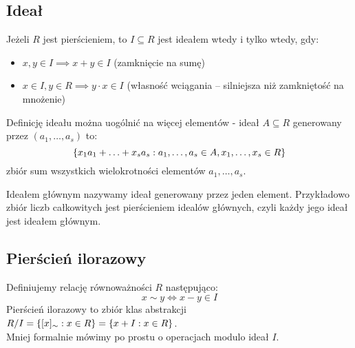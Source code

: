 \subsection{Ideał}
Jeżeli \( R \) jest pierścieniem, to \( I \subseteq R \) jest ideałem wtedy i tylko wtedy, gdy:
\begin{itemize}
    \item \( x, y \in I \implies x + y \in I \) (zamknięcie na sumę)
    \item \( x \in I, y \in R \implies y\cdot x \in I \) (własność wciągania -- silniejsza niż zamkniętość na mnożenie)
\end{itemize}

Definicję ideału można uogólnić na więcej elementów - ideał \( A \subseteq R \) generowany przez \( (a_1, \ldots, a_s) \) to:
\[
    \set{ x_1 a_1 + \ldots + x_s a_s : a_1, \ldots, a_s \in A, x_1, \ldots, x_s \in R}
\]
zbiór sum wszystkich wielokrotności elementów \( a_1, \ldots, a_s \).

Ideałem głównym nazywamy ideał generowany przez jeden element.
Przykładowo zbiór liczb całkowitych jest pierścieniem idealów głównych, czyli każdy jego ideał jest ideałem głównym.

\subsection{Pierścień ilorazowy}
Definiujemy relację równoważności \( R \) następująco:
\[
    x \sim y \iff x - y \in I
\]
Pierścień ilorazowy to zbiór klas abstrakcji \( R/I = \set{[x]_{\sim} : x \in R} = \set{x + I : x \in R} \). \\
Mniej formalnie mówimy po prostu o operacjach modulo ideał \( I \).

